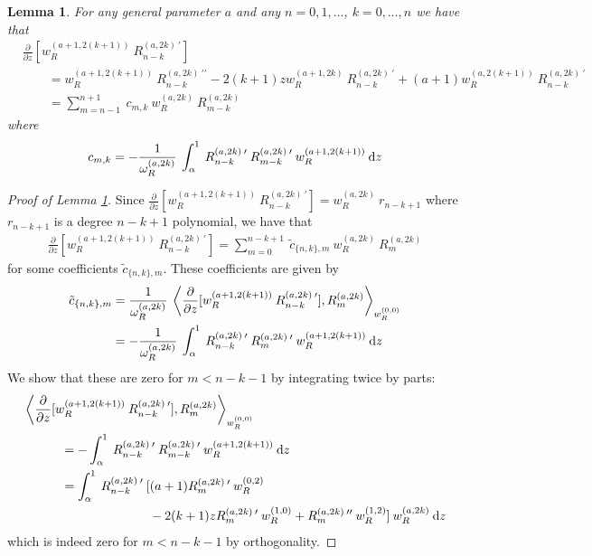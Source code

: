 \documentclass[11pt, oneside]{article}   	%
\newcommand{\genjac}{R}
\newcommand{\genjacnmk}{\genjac_{n-k}}
\newcommand{\genjacw}{w_\genjac}
\newcommand{\normgenjac}{\omega_\genjac}
\newcommand{\ppz}{\frac{\partial}{\partial z}}
\newtheorem{lemma}{Lemma}
\begin{document}
\begin{lemma}\label{lemma:Rsecondderivative}
For any general parameter $a$ and any $n = 0,1,\dots$, $k = 0,\dots,n$ we have that
\begin{align*}
	&\ppz[\genjacw^{(a+1, 2(k+1))} \: \genjacnmk^{(a,2k) \: \prime}] \\
	&\quad \quad = \genjacw^{(a+1, 2(k+1))} \: \genjacnmk^{(a,2k) \: \prime \prime} - 2(k+1)z \genjacw^{(a+1, 2k)} \: \genjacnmk^{(a,2k) \: \prime} + (a+1) \genjacw^{(a, 2(k+1))} \: \genjacnmk^{(a,2k) \: \prime} \\
	&\quad \quad = \sum_{m = n-1}^{n+1} \: c_{m,k} \: \genjacw^{(a, 2k)} \: \genjac_{m-k}^{(a,2k)}
\end{align*}
where 
\begin{align*}
	c_{m,k} = - \frac{1}{\normgenjac^{(a,2k)}} \: \int_\alpha^1 \: \genjacnmk^{(a,2k) \: \prime} \: \genjac_{m-k}^{(a,2k) \: \prime} \: \genjacw^{(a+1, 2(k+1))} \: \D z
\end{align*}
\end{lemma}
\begin{proof}[Proof of Lemma \ref{lemma:Rsecondderivative}]
Since $\ppz[\genjacw^{(a+1, 2(k+1))} \: \genjacnmk^{(a,2k) \: \prime}] = \genjacw^{(a, 2k)} \: r_{n-k+1}$ where $r_{n-k+1}$ is a degree $n - k + 1$ polynomial, we have that 
\begin{align*}
	\ppz[\genjacw^{(a+1, 2(k+1))} \: \genjacnmk^{(a,2k) \: \prime}] =\sum_{m=0}^{n-k+1} \: \tilde c_{\{n,k\},m} \: \genjacw^{(a, 2k)} \: \genjac_{m}^{(a,2k)}
\end{align*}
for some coefficients $\tilde c_{\{n,k\},m}$. These coefficients are given by
\begin{align*}
	\tilde c_{\{n,k\},m} &= \frac{1}{\normgenjac^{(a,2k)}} \: \ip<\ppz[\genjacw^{(a+1, 2(k+1))} \: \genjacnmk^{(a,2k) \: \prime}], \genjac_{m}^{(a,2k)}>_{\genjacw^{(0,0)}} \\
	&= - \frac{1}{\normgenjac^{(a,2k)}}  \: \int_\alpha^1 \: \genjacnmk^{(a,2k) \: \prime} \: \genjac_{m}^{(a,2k) \: \prime} \: \genjacw^{(a+1, 2(k+1))} \: \D z
\end{align*}
We show that these are zero for $m < n - k - 1$ by integrating twice by parts:
\begin{align*}
	&\ip<\ppz[\genjacw^{(a+1, 2(k+1))} \: \genjacnmk^{(a,2k) \: \prime}], \genjac_{m}^{(a,2k)}>_{\genjacw^{(0,0)}} \\
	&\quad \quad \quad = - \int_\alpha^1 \: \genjacnmk^{(a,2k) \: \prime} \: \genjac_{m-k}^{(a,2k) \: \prime} \: \genjacw^{(a+1, 2(k+1))} \: \D z \\
	&\quad \quad \quad = \int_\alpha^1 \: \genjacnmk^{(a,2k) \: \prime} \: [(a+1) \genjac_{m}^{(a,2k) \: \prime} \: \genjacw^{(0, 2)} \\
	&\quad \quad \quad \quad \quad \quad \quad \quad \quad \quad - 2(k+1) z \genjac_{m}^{(a,2k) \: \prime} \: \genjacw^{(1, 0)} + \genjac_{m}^{(a,2k) \: \prime \prime} \: \genjacw^{(1, 2)}] \: \genjacw^{(a, 2k)} \: \D z
\end{align*}
which is indeed zero for $m < n - k - 1$ by orthogonality.
\end{proof}
\end{document}
